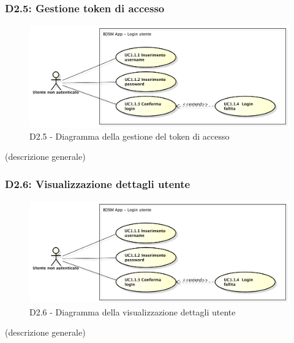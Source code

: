 		\subsubsection{D2.5: Gestione token di accesso} %
		\label{ssub:gestione_token_di_accesso}
		\begin{figure}[!htbp]
			\centering
			\centerline{\includegraphics[scale=0.45]{./images/UC1_1.pdf}}
			\caption{D2.5 - Diagramma della gestione del token di accesso}
		\end{figure}
		\noindent
		[TO DO] (descrizione generale)

		\subsubsection{D2.6: Visualizzazione dettagli utente} %
		\label{ssub:visualizzazione_dettagli_utente}
		\begin{figure}[!htbp]
			\centering
			\centerline{\includegraphics[scale=0.45]{./images/UC1_1.pdf}}
			\caption{D2.6 - Diagramma della visualizzazione dettagli utente}
		\end{figure}
		\noindent
		[TO DO] (descrizione generale)

